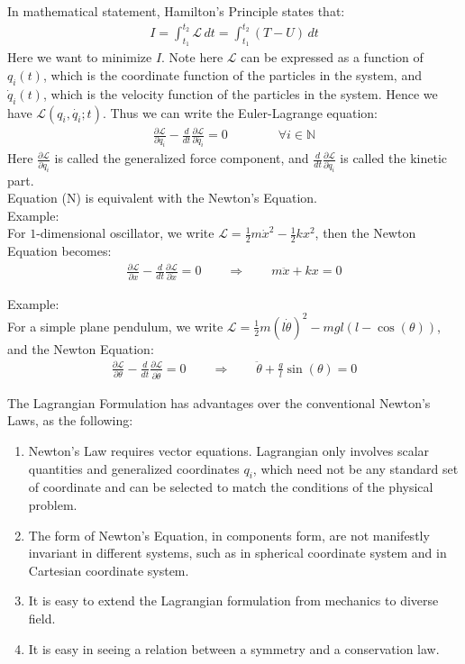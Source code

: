 \documentclass[11pt,oneside]{book}
\theoremstyle{break}
\theoremstyle{break}
\newcommand{\N}{\mathbb{N}}
\newcommand{\pd}{\partial}
\newcommand{\example}{\color{green}Example: \color{black}}
\begin{document}
In mathematical statement, Hamilton's Principle states that:
\begin{align*}
I = \int_{t_1}^{t_2}\mathcal{L} \, dt = \int_{t_1}^{t_2}(T-U)\, dt 
\end{align*}
Here we want to minimize $I$. Note here $\mathcal{L}$ can be expressed as a function of $q_i(t)$, which is the coordinate function of the particles in the system, and $\dot{q}_i(t)$, which is the velocity function of the particles in the system. Hence we have $\mathcal{L}(q_i, \dot{q_i}; t)$. Thus we can write the Euler-Lagrange equation:
\begin{align*}
\frac{\pd \mathcal{L}}{\pd q_i} - \frac{d}{dt}\frac{\pd \mathcal{L}}{\pd \dot{q_i}} = 0 \qquad\qquad\forall  i \in \N \tag{N}
\end{align*}
Here $\frac{\pd \mathcal{L}}{\pd q_i}$ is called the generalized force component, and $\frac{d}{dt}\frac{\pd \mathcal{L}}{\pd \dot{q}_i}$ is called the kinetic part.\\ Equation (N) is equivalent with the Newton's Equation.\\

\example\\
For $1$-dimensional oscillator, we write $\mathcal{L} = \frac{1}{2}m \dot{x}^2 - \frac{1}{2}k x^2$, then the Newton Equation becomes:
\begin{align*}
\frac{\pd \mathcal{L}}{\pd x} - \frac{d}{dt}\frac{\pd \mathcal{L}}{\pd \dot{x}} =  0 \qquad \Rightarrow \qquad m \ddot{x}+kx = 0
\end{align*}

\example\\
For a simple plane pendulum, we write $\mathcal{L} = \frac{1}{2}m(l\dot{\theta})^2 - mgl(l - \cos(\theta))$, and the Newton Equation:
\begin{align*}
\frac{\pd \mathcal{L}}{\pd \theta} - \frac{d}{dt}\frac{\pd \mathcal{L}}{\pd \dot{\theta}} = 0\qquad\Rightarrow\qquad \ddot{\theta}+\frac{g}{l}\sin(\theta) = 0
\end{align*}

\hfill\break
\hfill\break
The Lagrangian Formulation has advantages over the conventional Newton's Laws, as the following:
\begin{enumerate}[topsep=3pt,itemsep=-1ex,partopsep=1ex,parsep=1ex]
\item Newton's Law requires vector equations. Lagrangian only involves scalar quantities and generalized coordinates $q_i$, which need not be any standard set of coordinate and can be selected to match the conditions of the physical problem.
\item The form of Newton's Equation, in components form, are not manifestly invariant in different systems, such as in spherical coordinate system and in Cartesian coordinate system.
\item It is easy to extend the Lagrangian formulation from mechanics to diverse field.
\item It is easy in seeing a relation between a symmetry and a conservation law. 
\end{enumerate}
\end{document}
